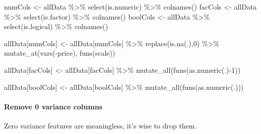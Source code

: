 \documentclass[
]{article}
\newenvironment{Shaded}{\begin{snugshade}}{\end{snugshade}}
\newcommand{\DecValTok}[1]{\textcolor[rgb]{0.00,0.00,0.81}{#1}}
\newcommand{\FunctionTok}[1]{\textcolor[rgb]{0.00,0.00,0.00}{#1}}
\newcommand{\NormalTok}[1]{#1}
\newcommand{\OtherTok}[1]{\textcolor[rgb]{0.56,0.35,0.01}{#1}}
\newcommand{\SpecialCharTok}[1]{\textcolor[rgb]{0.00,0.00,0.00}{#1}}
\begin{document}
\begin{Shaded}
\begin{Highlighting}[]
\NormalTok{numCols }\OtherTok{\textless{}{-}}\NormalTok{ allData }\SpecialCharTok{\%\textgreater{}\%} \FunctionTok{select}\NormalTok{(is.numeric) }\SpecialCharTok{\%\textgreater{}\%} \FunctionTok{colnames}\NormalTok{()}
\NormalTok{facCols }\OtherTok{\textless{}{-}}\NormalTok{ allData }\SpecialCharTok{\%\textgreater{}\%} \FunctionTok{select}\NormalTok{(is.factor) }\SpecialCharTok{\%\textgreater{}\%} \FunctionTok{colnames}\NormalTok{()}
\NormalTok{boolCols }\OtherTok{\textless{}{-}}\NormalTok{ allData }\SpecialCharTok{\%\textgreater{}\%} \FunctionTok{select}\NormalTok{(is.logical) }\SpecialCharTok{\%\textgreater{}\%} \FunctionTok{colnames}\NormalTok{()}

\NormalTok{allData[numCols] }\OtherTok{\textless{}{-}}\NormalTok{ allData[numCols] }\SpecialCharTok{\%\textgreater{}\%} 
  \FunctionTok{replace}\NormalTok{(}\FunctionTok{is.na}\NormalTok{(.),}\DecValTok{0}\NormalTok{) }\SpecialCharTok{\%\textgreater{}\%} 
  \FunctionTok{mutate\_at}\NormalTok{(}\FunctionTok{vars}\NormalTok{(}\SpecialCharTok{{-}}\NormalTok{price), }\FunctionTok{funs}\NormalTok{(scale))}

\NormalTok{allData[facCols] }\OtherTok{\textless{}{-}}\NormalTok{ allData[facCols] }\SpecialCharTok{\%\textgreater{}\%}
  \FunctionTok{mutate\_all}\NormalTok{(}\FunctionTok{funs}\NormalTok{(}\FunctionTok{as.numeric}\NormalTok{(.)}\SpecialCharTok{{-}}\DecValTok{1}\NormalTok{))}

\NormalTok{allData[boolCols] }\OtherTok{\textless{}{-}}\NormalTok{ allData[boolCols] }\SpecialCharTok{\%\textgreater{}\%} 
  \FunctionTok{mutate\_all}\NormalTok{(}\FunctionTok{funs}\NormalTok{(}\FunctionTok{as.numeric}\NormalTok{(.)))}
\end{Highlighting}
\end{Shaded}

\hypertarget{remove-0-variance-columns}{%
\paragraph{Remove 0 variance columns}\label{remove-0-variance-columns}}

Zero variance features are meaningless, it's wise to drop them.
\end{document}
